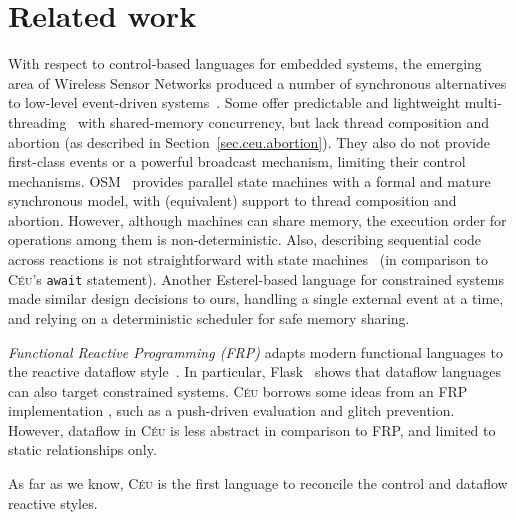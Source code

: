 \documentclass{acm_proc_article-sp}
\newcommand{\CEU}{\textsc{C\'{e}u}\xspace}
\newcommand{\code}[1] {{\small{\texttt{#1}}}}
\newcommand{\1}{\;}
\newcommand{\2}{\;\;}
\newcommand{\3}{\;\;\;}
\newcommand{\5}{\;\;\;\;\;}
\begin{document}
\section{Related work}
\label{sec.related}

With respect to control-based languages for embedded systems, the emerging area 
of Wireless Sensor Networks produced a number of synchronous alternatives to 
low-level event-driven 
systems~\cite{wsn.protothreads,wsn.sol,wsn.osm,wsn.tinythreads}.
%
Some offer predictable and lightweight
multi-threading~\cite{wsn.protothreads,wsn.tinythreads} with shared-memory 
concurrency, but lack thread composition and abortion (as described in 
Section~\ref{sec.ceu.abortion}).
They also do not provide first-class events or a powerful broadcast mechanism, 
limiting their control mechanisms.
%
OSM~\cite{wsn.osm} provides parallel state machines with a formal and mature 
synchronous model, with (equivalent) support to thread composition and 
abortion.
However, although machines can share memory, the execution order for operations 
among them is non-deterministic.
Also, describing sequential code across reactions is not straightforward with 
state machines~\cite{wsn.osm} (in comparison to \CEU's \code{await} statement).
%
Another Esterel-based language for constrained systems~\cite{wsn.sol} made 
similar design decisions to ours, handling a single external event at a time, 
and relying on a deterministic scheduler for safe memory sharing.

\emph{Functional Reactive Programming (FRP)} adapts modern functional languages 
to the reactive dataflow style~\cite{frp.principles}.
In particular, Flask~\cite{wsn.flask} shows that dataflow languages can also 
target constrained systems.
%
\CEU borrows some ideas from an FRP implementation \cite{frtime.embedding}, 
such as a push-driven evaluation and glitch prevention.
However, dataflow in \CEU is less abstract in comparison to FRP, and limited to 
static relationships only.

As far as we know, \CEU is the first language to reconcile the control and 
dataflow reactive styles.
\end{document}
